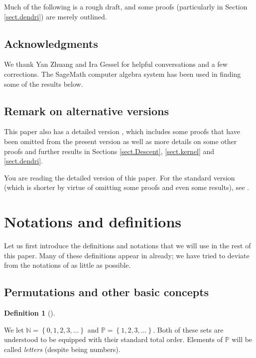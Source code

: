 \documentclass[numbers=enddot,12pt,final,onecolumn,notitlepage]{scrartcl}%
\theoremstyle{definition}
\newtheorem{defi}[theo]{Definition}
\newenvironment{definition}[1][]
{\begin{defi}[#1]\begin{leftbar}}
{\end{leftbar}\end{defi}}
\newenvironment{verlong}{}{}
\newenvironment{vershort}{}{}
\newenvironment{noncompile}{}{}
\begin{document}
\begin{noncompile}
Much of the following is a rough draft, and some proofs (particularly in
Section \ref{sect.dendri}) are merely outlined.
\end{noncompile}

\subsection*{Acknowledgments}

We thank Yan Zhuang and Ira Gessel for helpful conversations and a few
corrections. The SageMath computer algebra system \cite{SageMath} has been
used in finding some of the results below.

\subsection{Remark on alternative versions}

\begin{vershort}
This paper also has a detailed version \cite{verlong}, which includes some
proofs that have been omitted from the present version as well as more details
on some other proofs and further results in Sections \ref{sect.Descent},
\ref{sect.kernel} and \ref{sect.dendri}.
\end{vershort}

\begin{verlong}
You are reading the detailed version of this paper. For the standard version
(which is shorter by virtue of omitting some proofs and even some results),
see \cite{vershort}.
\end{verlong}

\section{\label{sect.notations}Notations and definitions}

Let us first introduce the definitions and notations that we will use in the
rest of this paper. Many of these definitions appear in \cite{part1} already;
we have tried to deviate from the notations of \cite{part1} as little as possible.

\subsection{Permutations and other basic concepts}

\begin{definition}
We let $\mathbb{N}=\left\{  0,1,2,3,\ldots\right\}  $ and $\mathbb{P}=\left\{
1,2,3,\ldots\right\}  $. Both of these sets are understood to be equipped with
their standard total order.
Elements of $\mathbb{P}$ will be called \textit{letters} (despite being
numbers).
\end{definition}
\end{document}
